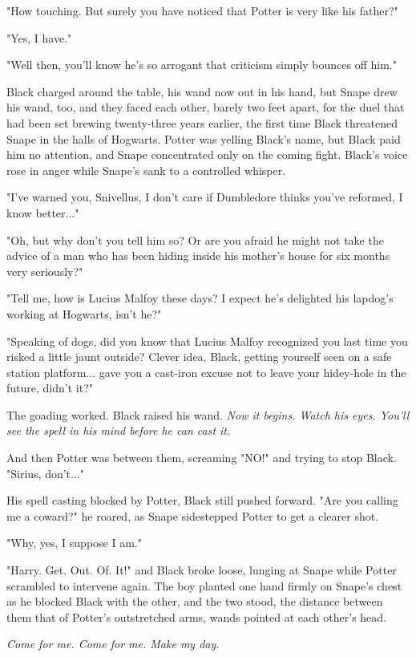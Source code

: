 "How touching. But surely you have noticed that Potter is very like his father?"

"Yes, I have."

"Well then, you'll know he's so arrogant that criticism simply bounces off him."

Black charged around the table, his wand now out in his hand, but Snape drew his wand, too, and they faced each other, barely two feet apart, for the duel that had been set brewing twenty-three years earlier, the first time Black threatened Snape in the halls of Hogwarts. Potter was yelling Black's name, but Black paid him no attention, and Snape concentrated only on the coming fight. Black's voice rose in anger while Snape's sank to a controlled whisper.

"I've warned you, Snivellus, I don't care if Dumbledore thinks you've reformed, I know better..."

"Oh, but why don't you tell him so? Or are you afraid he might not take the advice of a man who has been hiding inside his mother's house for six months very seriously?"

"Tell me, how is Lucius Malfoy these days? I expect he's delighted his lapdog's working at Hogwarts, isn't he?"

"Speaking of dogs, did you know that Lucius Malfoy recognized you last time you risked a little jaunt outside? Clever idea, Black, getting yourself seen on a safe station platform... gave you a cast-iron excuse not to leave your hidey-hole in the future, didn't it?"

The goading worked. Black raised his wand. \emph{Now it begins. Watch his eyes. You'll see the spell in his mind before he can cast it.}

And then Potter was between them, screaming "NO!" and trying to stop Black. "Sirius, don't..."

His spell casting blocked by Potter, Black still pushed forward. "Are you calling me a coward?" he roared, as Snape sidestepped Potter to get a clearer shot.

"Why, yes, I suppose I am."

"Harry. Get. Out. Of. It!" and Black broke loose, lunging at Snape while Potter scrambled to intervene again. The boy planted one hand firmly on Snape's chest as he blocked Black with the other, and the two stood, the distance between them that of Potter's outstretched arms, wands pointed at each other's head.

\emph{Come for me. Come for me. Make my day.}

